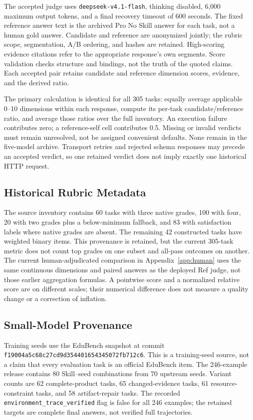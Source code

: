 The accepted judge uses \texttt{deepseek-v4.1-flash}, thinking disabled,
6,000 maximum output tokens, and a final recovery timeout of 600 seconds.
The fixed reference answer text is the archived Pro No Skill answer for each
task, not a human gold answer. Candidate and reference are anonymized jointly;
the rubric scope, segmentation, A/B ordering, and hashes are retained.
High-scoring evidence citations refer to the appropriate response's own
segments. Score validation checks structure and bindings, not the truth of the
quoted claims. Each accepted pair retains candidate and reference dimension
scores, evidence, and the derived ratio.

The primary calculation is identical for all 305 tasks: equally average
applicable 0--10 dimensions within each response, compute its per-task
candidate/reference ratio, and average those ratios over the full inventory.
An execution failure contributes zero; a reference-self cell contributes 0.5.
Missing or invalid verdicts must remain unresolved, not be assigned convenient
defaults. None remain in the five-model archive. Transport retries and rejected
schema responses may precede an accepted verdict, so one retained verdict does
not imply exactly one historical HTTP request.

\subsection{Historical Rubric Metadata}

The source inventory contains 60 tasks with three native grades, 100 with four,
20 with two grades plus a below-minimum fallback, and 83 with satisfaction
labels where native grades are absent. The remaining 42 constructed tasks have
weighted binary items. This provenance is retained, but the current 305-task
metric does not count top grades on one subset and all-pass outcomes on another.
The current human-adjudicated comparison in Appendix~\ref{app:human} uses
the same continuous dimensions and paired answers as the deployed Ref judge,
not those earlier aggregation formulas. A pointwise score and a normalized
relative score are on different scales; their numerical difference does not
measure a quality change or a correction of inflation.

\subsection{Small-Model Provenance}

Training seeds use the EduBench snapshot at commit
\texttt{f19004a5c68c27cd9d35\allowbreak 4401654345072fb712c6}. This is a training-seed
source, not a claim that every evaluation task is an official EduBench item.
The 246-example release contains 80 Skill--seed combinations from 70 upstream
seeds. Variant counts are 62 complete-product tasks, 65 changed-evidence tasks,
61 resource-constraint tasks, and 58 artifact-repair tasks. The recorded
\texttt{environment\_trace\_verified} flag is false for all 246 examples;
the retained targets are complete final answers, not verified full trajectories.

